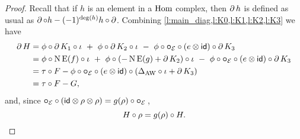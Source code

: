 \begin{proof}
	Recall that if $h$ is an element in a $\Hom$ complex, then $\bd h$ is defined as usual as $\bd \comp h - (-1)^{\deg(h)} h \comp \bd$.
	Combining \cref{l:main_diag,l:K0,l:K1,l:K2,l:K3} we have
	\begin{align*}
		\bd H &=
		\phi \comp \bd K_1 \comp \iota \ +\
		\phi \comp \bd K_2 \comp \iota \ -\
		\phi \comp \bcomp_{\BE} \comp (e \ot \id) \comp \bd K_3 \\ &=
		\phi \comp \chains\EE(f) \comp \iota \ +\
		\phi \comp (-\chains\EE(g) + \bd K_2) \comp \iota \ -\
		\phi \comp \bcomp_{\BE} \comp (e \ot \id) \comp \bd K_3 \\ &=
		\tau \comp F - \phi \comp \bcomp_{\BE} \comp (e \ot \id) \comp (\Delta_{\AW} \comp \iota + \bd K_3) \\ &=
		\tau \comp F - G,
	\end{align*}
	and, since $\bcomp_{\BE} \comp (\id \ot \rho \ot \rho) = g(\rho) \comp \bcomp_{\BE}$\,,
	\[
	H \comp \rho = g(\rho) \comp H. \qedhere
	\]
\end{proof}